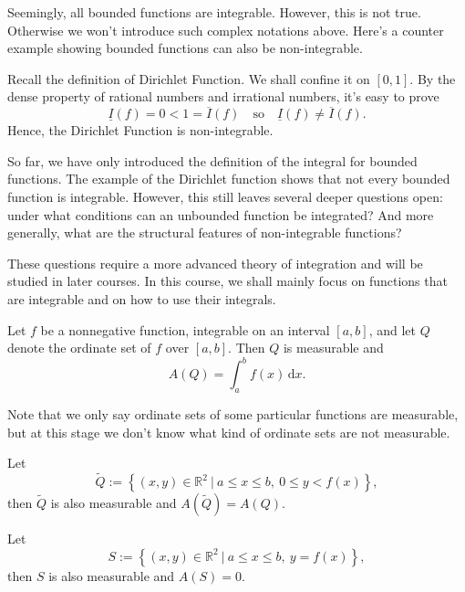 	\begin{remarkenv}
		Seemingly, all bounded functions are integrable. However, this is not true. Otherwise we won't introduce such complex notations above. Here's a counter example showing bounded functions can also be non-integrable.
	\end{remarkenv}
	\begin{exampleenv}
		Recall the definition of Dirichlet Function. We shall confine it on $[0,1]$. By the dense property of rational numbers and irrational numbers, it's easy to prove
		\[
		\underline{I}(f) = 0 < 1 = \overline{I}(f) \quad \text{so} \quad \underline{I}(f) \neq \overline{I}(f).
		\]
		Hence, the Dirichlet Function is non-integrable.
	\end{exampleenv}
    \begin{remarkenv}
	So far, we have only introduced the definition of the integral for bounded functions. 
	The example of the Dirichlet function shows that not every bounded function is integrable. 
	However, this still leaves several deeper questions open: under what conditions can an unbounded function be integrated? 
	And more generally, what are the structural features of non-integrable functions?

	These questions require a more advanced theory of integration and will be studied in later courses. 
	In this course, we shall mainly focus on functions that are integrable and on how to use their integrals.
\end{remarkenv}
	\begin{theoremenv}
	Let $f$ be a nonnegative function, integrable on an interval $[a,b]$, and let $Q$ denote the ordinate set of $f$ over $[a,b]$. Then $Q$ is measurable and
	\[
	A(Q)=\int_a^b f(x)\,\mathrm{d}x.
	\]
	\end{theoremenv}
	\begin{remarkenv}
		Note that we only say ordinate sets of some particular functions are measurable, but at this stage we don't know what kind of ordinate sets are not measurable.
	\end{remarkenv}
	\begin{propositionenv}
		Let
		\[
		\widetilde{Q}:=\left\{(x,y)\in \mathbb{R}^2\ |\ a\le x \le b,\ 0\le y< f(x)\right\},
		\]
		then $\widetilde{Q}$ is also measurable and $A\!\left(\widetilde{Q}\right)=A(Q)$.
	\end{propositionenv}
	\begin{propositionenv}
		Let 
		\[
		S:= \left\{(x,y)\in \mathbb{R}^2\ |\ a\le x \le b,\ y=f(x)\right\},
		\]
		then $S$ is also measurable and $A(S)=0$.
	\end{propositionenv}
	
